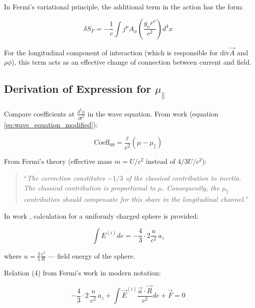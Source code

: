 \documentclass[12pt, a4paper]{article}
\begin{document}
In Fermi's variational principle, the additional term in the action has the form:

\begin{equation}
\delta S_F = -\frac{1}{c} \int j^\mu A_\mu \left( \frac{g_\nu r^\nu}{c^2} \right) d^4x
\label{eq:fermi_action_term}
\end{equation}

For the longitudinal component of interaction (which is responsible for $\text{div} \vec{A}$ and $\rho \phi$), this term acts as an effective change of connection between current and field.

\subsection{Derivation of Expression for $\mu_{\parallel}$}

Compare coefficients at $\frac{\partial^2 \phi}{\partial t^2}$ in the wave equation. From work \cite{NikolaevLorentz} (equation \ref{eq:wave_equation_modified}):

\begin{equation}
\text{Coeff}_{09} = \frac{\varepsilon}{c^2} (\mu - \mu_{\parallel})
\label{eq:coefficient_09}
\end{equation}

From Fermi's theory (effective mass $m = U/c^2$ instead of $4/3 U/c^2$):

\begin{quote}
``\textit{The correction constitutes $-1/3$ of the classical contribution to inertia. The classical contribution is proportional to $\mu$. Consequently, the $\mu_{\parallel}$ contribution should compensate for this share in the longitudinal channel.}''
\end{quote}

In work \cite{FermiSolution}, calculation for a uniformly charged sphere is provided:

\begin{equation}
\int E^{(i)} de = -\frac{4}{3} \cdot 2\frac{u}{c^2}\,a_z
\label{eq:fermi_sphere}
\end{equation}

where $u = \frac{3}{5}\frac{e^2}{R}$ --- field energy of the sphere.

Relation (4) from Fermi's work in modern notation:

\begin{equation}
-\frac{4}{3}\cdot 2 \,\frac{u}{c^2} \, a_z + \int \vec{E}^{(i)}\frac{\vec{a} \cdot \vec{R}}{c^2} de + \vec{F} = 0
\label{eq:fermi_ratio}
\end{equation}
\end{document}
